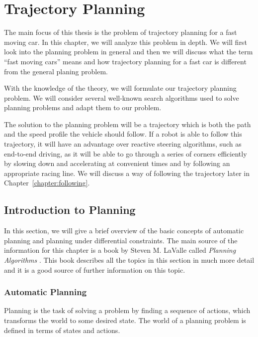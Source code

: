 \chapter{Trajectory Planning}
\label{chapter:trajectory_planning}

The main focus of this thesis is the problem of trajectory planning for a fast moving car. In this chapter, we will analyze this problem in depth. We will first look into the planning problem in general and then we will discuss what the term ``fast moving cars'' means and how trajectory planning for a fast car is different from the general planing problem.

With the knowledge of the theory, we will formulate our trajectory planning problem. We will consider several well-known search algorithms used to solve planning problems and adapt them to our problem.

The solution to the planning problem will be a trajectory which is both the path and the speed profile the vehicle should follow. If a robot is able to follow this trajectory, it will have an advantage over reactive steering algorithms, such as end-to-end driving, as it will be able to go through a series of corners efficiently by slowing down and accelerating at convenient times and by following an appropriate racing line. We will discuss a way of following the trajectory later in Chapter~\ref{chapter:following}.

\section{Introduction to Planning}

In this section, we will give a brief overview of the basic concepts of automatic planning and planning under differential constraints. The main source of the information for this chapter is a book by Steven M. LaValle called \textit{Planning Algorithms} \cite{lavalle_2006}. This book describes all the topics in this section in much more detail and it is a good source of further information on this topic.

\subsection{Automatic Planning}

Planning is the task of solving a problem by finding a sequence of actions, which transforms the world to some desired state. The world of a planning problem is defined in terms of states and actions.

